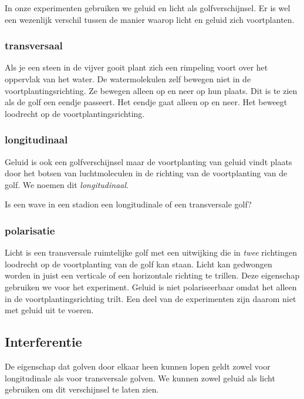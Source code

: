 \documentclass[../../main.tex]{subfiles}
\begin{document}
In onze experimenten gebruiken we geluid en licht als golfverschijnsel. Er is wel een wezenlijk verschil tussen de manier waarop licht en geluid zich voortplanten.

\subsubsection{transversaal}
Als je een steen in de vijver gooit plant zich een rimpeling voort over het oppervlak van het water. De watermolekulen zelf bewegen niet in de voortplantingsrichting. Ze bewegen alleen op en neer op hun plaats. Dit is te zien als de golf een eendje passeert. Het eendje gaat alleen op en neer. Het beweegt loodrecht op de voortplantingsrichting.

\subsubsection{longitudinaal}
Geluid is ook een golfverschijnsel maar de voortplanting van geluid vindt plaats door het botsen van luchtmoleculen in de richting van de voortplanting van de golf. We noemen dit \textit{longitudinaal}.

\easy Is een wave in een stadion een longitudinale of een transversale golf?
\subsubsection*{polarisatie}
Licht is een transversale ruimtelijke golf met een uitwijking die in \textit{twee} richtingen loodrecht op de voortplanting van de golf kan staan. Licht kan gedwongen worden in juist een verticale of een horizontale richting te trillen.  
Deze eigenschap gebruiken we voor het experiment.
Geluid is niet polariseerbaar omdat het alleen in de voortplantingsrichting trilt. Een deel van de experimenten zijn daarom niet met geluid uit te voeren.

\subsection*{Interferentie}
De eigenschap dat golven door elkaar heen kunnen lopen geldt zowel voor longitudinale als voor transversale golven. We kunnen zowel geluid als licht gebruiken om dit verschijnsel te laten zien.
\end{document}
